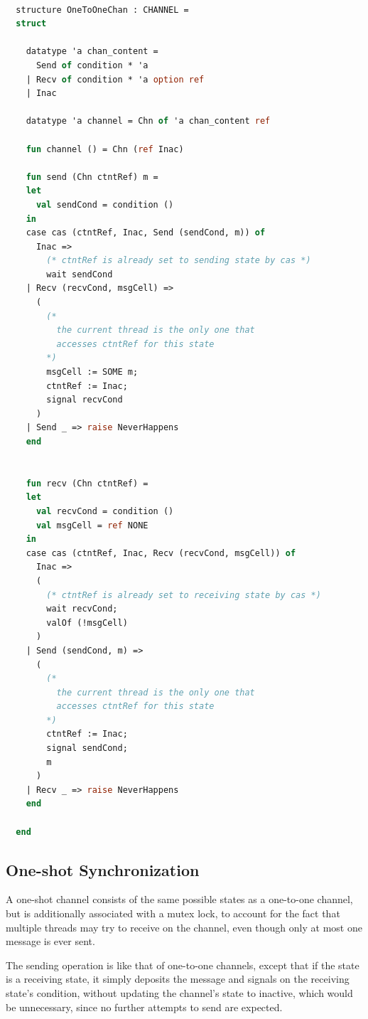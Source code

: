 \documentclass[letterpaper, 11pt]{extarticle}
\begin{document}
\begin{lstlisting}[language=ML, mathescape]

  structure OneToOneChan : CHANNEL =
  struct

    datatype 'a chan_content =
      Send of condition * 'a
    | Recv of condition * 'a option ref
    | Inac  

    datatype 'a channel = Chn of 'a chan_content ref

    fun channel () = Chn (ref Inac)

    fun send (Chn ctntRef) m =
    let
      val sendCond = condition ()
    in
    case cas (ctntRef, Inac, Send (sendCond, m)) of
      Inac => 
        (* ctntRef is already set to sending state by cas *)
        wait sendCond
    | Recv (recvCond, msgCell) =>
      (
        (*
          the current thread is the only one that
          accesses ctntRef for this state
        *)
        msgCell := SOME m;
        ctntRef := Inac;
        signal recvCond
      )
    | Send _ => raise NeverHappens
    end


    fun recv (Chn ctntRef) =
    let
      val recvCond = condition ()
      val msgCell = ref NONE 
    in
    case cas (ctntRef, Inac, Recv (recvCond, msgCell)) of
      Inac =>
      (
        (* ctntRef is already set to receiving state by cas *)
        wait recvCond;
        valOf (!msgCell)
      )
    | Send (sendCond, m) =>
      (
        (*
          the current thread is the only one that
          accesses ctntRef for this state
        *)
        ctntRef := Inac;
        signal sendCond;
        m
      )
    | Recv _ => raise NeverHappens
    end 

  end
\end{lstlisting}

\subsection{One-shot Synchronization}

A one-shot channel consists of the same possible states as a one-to-one channel, but is
additionally associated with a mutex lock, to account for the fact that multiple threads may
try to receive on the channel, even though only at most one message is ever sent.

The sending operation is like that of one-to-one channels,
except that if the state is a receiving state, it simply deposits the message and signals
on the receiving state's condition,
without updating the channel's state to inactive, which would be unnecessary, since
no further attempts to send are expected.
\end{document}
